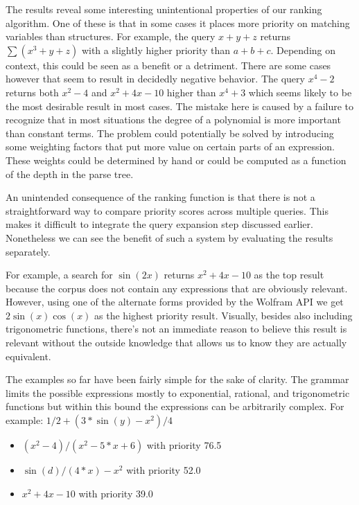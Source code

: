 \documentclass{sig-alternate}
\begin{document}
The results reveal some interesting unintentional properties of our ranking algorithm. One of these is that in
some cases it places more priority on matching variables than structures. For example, the query $x + y + z$ returns $\sum (x^3 + y+ z)$ with a slightly higher priority than $a + b + c$. Depending on context, this could
be seen as a benefit or a detriment. There are some cases however that seem to result in decidedly negative behavior. The query $x^4 - 2$ returns both $x^2 - 4$ and $x^2 + 4x - 10$ higher than $x^4 + 3$ which seems likely to be the most desirable result in most cases. The mistake here is caused by a failure to 
recognize that in most situations the degree of a polynomial is more important than constant terms. The 
problem could potentially be solved by introducing some weighting factors that put more value on certain
parts of an expression. These weights could be determined by hand or could be computed as a function of the
depth in the parse tree.

An unintended consequence of the ranking function is that there is not a straightforward way to compare 
priority scores across multiple queries. This makes it difficult to integrate the query expansion step
discussed earlier. Nonetheless we can see the benefit of such a system by evaluating the results separately.

For example,  a search for $\sin(2x)$ returns $x^2 + 4x - 10$ as the top result because the corpus does not contain
any expressions that are obviously relevant. However, using one of the alternate forms provided by the 
Wolfram API we get $2\sin(x)\cos(x)$ as the highest priority result. Visually, besides also including
trigonometric functions, there's not an immediate reason to believe this result is relevant without the
outside knowledge that allows us to know they are actually equivalent.

The examples so far have been fairly simple for the sake of clarity. The grammar limits the possible 
expressions mostly to exponential, rational, and trigonometric functions but within this bound the expressions can be arbitrarily complex. For example: $1/2 + (3 * \sin(y) -x^2)/4$
\begin{itemize}
    \item $(x^2 - 4)/(x^2 - 5*x + 6)$ with priority  76.5
    \item $\sin(d)/(4*x) - x^2$  with priority  52.0
    \item $x^2 + 4x - 10$  with priority  39.0
\end{itemize}
\end{document}
